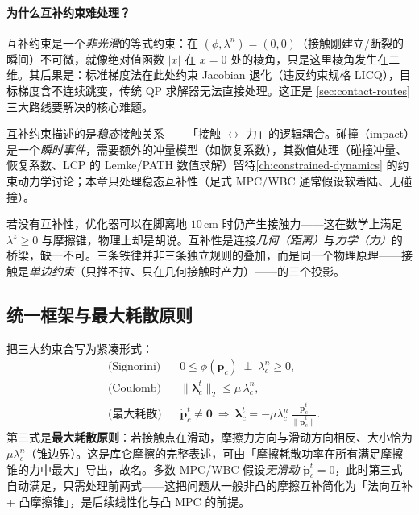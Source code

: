 \paragraph{为什么互补约束难处理？}
互补约束是一个\emph{非光滑}的等式约束：在 $(\phi,\lambda^n)=(0,0)$（接触刚建立/断裂的瞬间）不可微，就像绝对值函数 $|x|$ 在 $x=0$ 处的棱角，只是这里棱角发生在二维。其后果是：标准梯度法在此处约束 Jacobian 退化（违反约束规格 LICQ），目标梯度含不连续跳变，传统 QP 求解器无法直接处理。这正是 \cref{sec:contact-routes} 三大路线要解决的核心难题。

\begin{pitfall}[概念误区：互补性 = 碰撞检测？]
互补约束描述的是\emph{稳态}接触关系——「接触 $\leftrightarrow$ 力」的逻辑耦合。碰撞（impact）是一个\emph{瞬时事件}，需要额外的冲量模型（如恢复系数），其数值处理（碰撞冲量、恢复系数、LCP 的 Lemke/PATH 数值求解）留待\cref{ch:constrained-dynamics} 的约束动力学讨论；本章只处理稳态互补性（足式 MPC/WBC 通常假设软着陆、无碰撞）。
\end{pitfall}

\begin{pitfall}
若没有互补性，优化器可以在脚离地 $10\,$cm 时仍产生接触力——这在数学上满足 $\lambda^z\ge0$ 与摩擦锥，物理上却是胡说。互补性是连接\emph{几何（距离）}与\emph{力学（力）}的桥梁，缺一不可。三条铁律并非三条独立规则的叠加，而是同一个物理原理——接触是\emph{单边约束}（只推不拉、只在几何接触时产力）——的三个投影。
\end{pitfall}

\subsection{统一框架与最大耗散原则}
\label{subsec:max-dissipation}

把三大约束合写为紧凑形式：
\begin{equation}
  \begin{aligned}
  &\text{(Signorini)} && 0\le\phi(\boldsymbol{p}_c)\ \perp\ \lambda_c^n\ge0,\\
  &\text{(Coulomb)} && \|\boldsymbol{\lambda}_c^t\|_2\le\mu\,\lambda_c^n,\\
  &\text{(最大耗散)} && \dot{\boldsymbol{p}}_c^t\neq\boldsymbol{0}\ \Rightarrow\ \boldsymbol{\lambda}_c^t=-\mu\lambda_c^n\,\frac{\dot{\boldsymbol{p}}_c^t}{\|\dot{\boldsymbol{p}}_c^t\|}.
  \end{aligned}
  \label{eq:contact-unified}
\end{equation}
第三式是\textbf{最大耗散原则}：若接触点在滑动，摩擦力方向与滑动方向相反、大小恰为 $\mu\lambda_c^n$（锥边界）。这是库仑摩擦的完整表述，可由「摩擦耗散功率在所有满足摩擦锥的力中最大」导出，故名。多数 MPC/WBC 假设\emph{无滑动} $\dot{\boldsymbol{p}}_c^t=0$，此时第三式自动满足，只需处理前两式——这把问题从一般非凸的摩擦互补简化为「法向互补 + 凸摩擦锥」，是后续线性化与凸 MPC 的前提。

